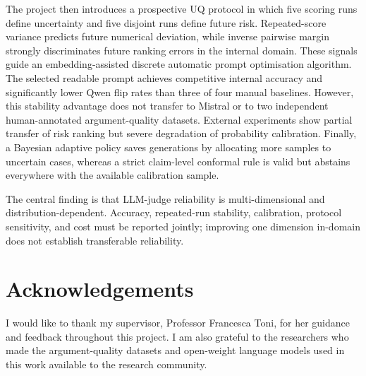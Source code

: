 \documentclass[11pt,twoside,a4paper]{report}
\begin{document}
The project then introduces a prospective UQ protocol in which five scoring runs
define uncertainty and five disjoint runs define future risk.  Repeated-score
variance predicts future numerical deviation, while inverse pairwise margin strongly
discriminates future ranking errors in the internal domain.  These signals guide an
embedding-assisted discrete automatic prompt optimisation algorithm.  The selected
readable prompt achieves competitive internal accuracy and significantly lower Qwen
flip rates than three of four manual baselines.  However, this stability advantage
does not transfer to Mistral or to two independent human-annotated argument-quality
datasets.  External experiments show partial transfer of risk ranking but severe
degradation of probability calibration.  Finally, a Bayesian adaptive policy saves
generations by allocating more samples to uncertain cases, whereas a strict
claim-level conformal rule is valid but abstains everywhere with the available
calibration sample.

The central finding is that LLM-judge reliability is multi-dimensional and
distribution-dependent.  Accuracy, repeated-run stability, calibration, protocol
sensitivity, and cost must be reported jointly; improving one dimension in-domain
does not establish transferable reliability.

\chapter*{Acknowledgements}

I would like to thank my supervisor, Professor Francesca Toni, for her guidance and
feedback throughout this project.  I am also grateful to the researchers who made
the argument-quality datasets and open-weight language models used in this work
available to the research community.

\tableofcontents
\clearpage
\listoffigures
{}
\clearpage
\listoftables
{}
\clearpage
\end{document}
